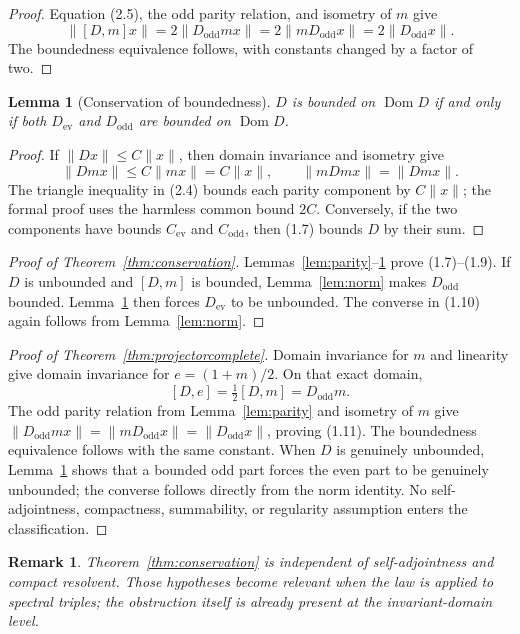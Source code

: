 \documentclass[11pt,reqno]{amsart}
\newtheorem{lemma}[theorem]{Lemma}
\newtheorem{remark}[theorem]{Remark}
\newcommand{\Dom}{\operatorname{Dom}}
\begin{document}
\begin{proof}
Equation (2.5), the odd parity relation, and isometry of $m$ give
\[
 \|[D,m]x\|=2\|D_{\mathrm{odd}}mx\|
 =2\|mD_{\mathrm{odd}}x\|=2\|D_{\mathrm{odd}}x\|.
\]
The boundedness equivalence follows, with constants changed by a factor of two.
\end{proof}

\begin{lemma}[Conservation of boundedness]\label{lem:bounded}
$D$ is bounded on $\Dom D$ if and only if both $D_{\mathrm{ev}}$ and $D_{\mathrm{odd}}$ are
bounded on $\Dom D$.
\end{lemma}

\begin{proof}
If $\|Dx\|\le C\|x\|$, then domain invariance and isometry give
\[
 \|Dmx\|\le C\|mx\|=C\|x\|,
 \qquad \|mDmx\|=\|Dmx\|.
\]
The triangle inequality in (2.4) bounds each parity component by $C\|x\|$; the formal proof uses
the harmless common bound $2C$.  Conversely, if the two components have bounds $C_{\mathrm{ev}}$
and $C_{\mathrm{odd}}$, then (1.7) bounds $D$ by their sum.
\end{proof}

\begin{proof}[Proof of Theorem~\ref{thm:conservation}]
Lemmas~\ref{lem:parity}--\ref{lem:bounded} prove (1.7)--(1.9).  If $D$ is unbounded and $[D,m]$
is bounded, Lemma~\ref{lem:norm} makes $D_{\mathrm{odd}}$ bounded.  Lemma~\ref{lem:bounded} then
forces $D_{\mathrm{ev}}$ to be unbounded.  The converse in (1.10) again follows from
Lemma~\ref{lem:norm}.
\end{proof}

\begin{proof}[Proof of Theorem~\ref{thm:projectorcomplete}]
Domain invariance for $m$ and linearity give domain invariance for $e=(1+m)/2$.  On that exact
domain,
\[
 [D,e]=\tfrac12[D,m]=D_{\mathrm{odd}}m.
\]
The odd parity relation from Lemma~\ref{lem:parity} and isometry of $m$ give
$\|D_{\mathrm{odd}}mx\|=\|mD_{\mathrm{odd}}x\|=\|D_{\mathrm{odd}}x\|$, proving (1.11).
The boundedness equivalence follows with the same constant.  When $D$ is genuinely unbounded,
Lemma~\ref{lem:bounded} shows that a bounded odd part forces the even part to be genuinely
unbounded; the converse follows directly from the norm identity.  No self-adjointness,
compactness, summability, or regularity assumption enters the classification.
\end{proof}

\begin{remark}
Theorem~\ref{thm:conservation} is independent of self-adjointness and compact resolvent.  Those
hypotheses become relevant when the law is applied to spectral triples; the obstruction itself is
already present at the invariant-domain level.
\end{remark}
\end{document}
